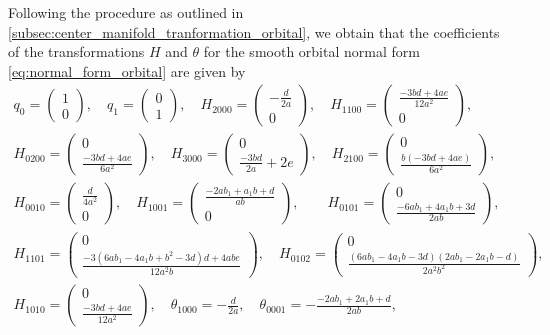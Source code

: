 Following the procedure as outlined in
\cref{subsec:center_manifold_tranformation_orbital}, we obtain that the coefficients
of the transformations $H$ and $\theta$ for the smooth orbital normal form
\cref{eq:normal_form_orbital} are given by
\begin{equation*}
\begin{gathered}
   q_{0} = \begin{pmatrix} 1 \\  0 \end{pmatrix}\!, \quad
   q_{1} = \begin{pmatrix} 0 \\  1 \end{pmatrix}\!, \quad
H_{2000} = \begin{pmatrix} -\frac{d}{2 a} \\ 0 \end{pmatrix}\!, \quad 
H_{1100} = \begin{pmatrix} \frac{-3 b d + 4 a e}{12 a^2} \\  0 \end{pmatrix}\!, \\
H_{0200} = \begin{pmatrix} 0 \\  \frac{-3 b d + 4 a e}{6 a^2} \end{pmatrix}\!, \quad
H_{3000} = \begin{pmatrix} 0 \\  \frac{-3 b d}{2 a} + 2 e \end{pmatrix}\!, \quad
H_{2100} = \begin{pmatrix} 0 \\  \frac{b (-3 b d + 4 a e)}{6 a^2} \end{pmatrix}\!, \\
H_{0010} = \begin{pmatrix} \frac{d}{4 a^2} \\  0 \end{pmatrix}\!, \quad
H_{1001} = \begin{pmatrix} \frac{-2 a b_1 + a_1 b + d}{a b} \\  0 \end{pmatrix}\!, \qquad
H_{0101} = \begin{pmatrix} 0 \\  \frac{-6 a b_1 + 4 a_1 b + 3 d}{2 a b} \end{pmatrix}\!, \\
H_{1101} = \begin{pmatrix} 0 \\  \frac{-3 (6 a b_1 - 4 a_1 b + b^2 - 3 d) d + 4 a b e}{12 a^2 b} \end{pmatrix}\!, \quad
H_{0102} = \begin{pmatrix} 0 \\  \frac{(6 a b_1 - 4 a_1 b - 3 d) (2 a b_1 - 2 a_1 b - d)}{2 a^2 b^2} \end{pmatrix}\!, \\
H_{1010} = \begin{pmatrix} 0 \\  \frac{-3 b d + 4 a e}{12 a^2} \end{pmatrix}\!, \quad
\theta_{1000} = -\frac{d}{2 a}, \quad
\theta_{0001} = -\frac{-2 a b_1 + 2 a_1 b + d}{2 a b},
\end{gathered}
\end{equation*}
